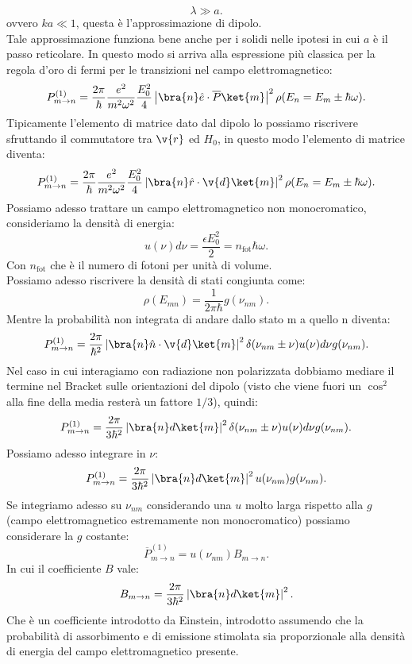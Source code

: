 \[
\lambda  \gg a
.\] 
ovvero $ka \ll 1$, questa è l'approssimazione di dipolo. \\
Tale approssimazione funziona bene anche per i solidi nelle ipotesi in cui $a$ è il passo reticolare. In questo modo si arriva alla espressione più classica per la regola d'oro di fermi per le transizioni nel campo elettromagnetico:
\[
    P^{(1) }_{m\to n}= 
    \frac{2\pi}{\hbar }\frac{e^2}{m^2\omega^2}\frac{E_0^2}{4}
    \left|\bra{n}\hat{e}\cdot \overline{P} \ket{m}\right|^2
    \rho(E_n=E_m \pm \hbar \omega) 
.\] 
Tipicamente l'elemento di matrice dato dal dipolo lo possiamo riscrivere sfruttando il commutatore tra $\v{r}$ ed $H_0$, in questo modo l'elemento di matrice diventa:
\[
    P^{(1) }_{m\to n}= 
    \frac{2\pi}{\hbar }\frac{e^2}{m^2\omega^2}\frac{E_0^2}{4}
    \left|\bra{n}\hat{r}\cdot \v{d} \ket{m}\right|^2
    \rho(E_n=E_m \pm \hbar \omega) 
.\] 
Possiamo adesso trattare un campo elettromagnetico non monocromatico, consideriamo la densità di energia:
\[
    u(\nu) d\nu = \frac{\epsilon E_0^2}{2} = n_\text{fot}\hbar \omega 
.\] 
Con $n_\text{fot} $ che è il numero di fotoni per unità di volume.\\
Possiamo adesso riscrivere la densità di stati congiunta come:
\[
    \rho(E_{mn}) = \frac{1}{2\pi\hbar }g(\nu_{nm}) 
.\] 
Mentre la probabilità non integrata di andare dallo stato m a quello n diventa:
\[
    P^{(1)}_{m\to n} =
    \frac{2\pi}{\hbar ^2}\left|\bra{n}\hat{n}\cdot \v{d} \ket{m}\right|^2
    \delta (\nu_{nm}\pm \nu) u(\nu) d\nu g(\nu_{nm}) 
.\] 
Nel caso in cui interagiamo con radiazione non polarizzata dobbiamo mediare il termine nel Bracket sulle orientazioni del dipolo (visto che viene fuori un $\cos^2$ alla fine della media resterà un fattore $1 /3$), quindi:
\[
    P^{(1)}_{m\to n} =
    \frac{2\pi}{3\hbar ^2}\left|\bra{n}d \ket{m}\right|^2
    \delta (\nu_{nm}\pm \nu) u(\nu) d\nu g(\nu_{nm}) 
.\]
Possiamo adesso integrare in $\nu$:
\[
    P^{(1) }_{m\to n}= \frac{2\pi}{3\hbar ^2}\left|\bra{n}d \ket{m}\right|^2
    u(\nu_{nm}) g(\nu_{nm}) 
.\] 
Se integriamo adesso su $\nu_{nm}$ considerando una $u$ molto larga rispetto alla $g$  (campo elettromagnetico estremamente non monocromatico) possiamo considerare la $g$ costante:
\[
    \overline{P}^{(1)}_{m\to n} =
    u(\nu_{nm}) B_{m\to n}
.\]
In cui il coefficiente $B$ vale:
\[
B_{m\to n} =
\frac{2\pi}{3\hbar ^2}\left|\bra{n}d \ket{m}\right|^2
.\] 
Che è un coefficiente introdotto da Einstein, introdotto assumendo che la probabilità di assorbimento e di emissione stimolata sia proporzionale alla densità di energia del campo elettromagnetico presente. \\
